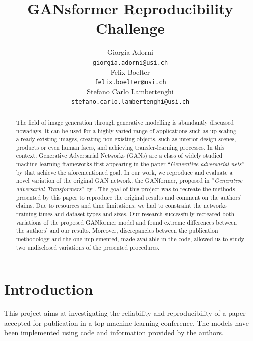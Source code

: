 \documentclass{article}
\title{GANsformer Reproducibility Challenge}
\author{%
	Giorgia Adorni \\
	\texttt{giorgia.adorni@usi.ch} \\
	\And
	Felix Boelter\\
	\texttt{felix.boelter@usi.ch}\\
	\And
	Stefano Carlo Lambertenghi\\
	\texttt{stefano.carlo.lambertenghi@usi.ch}\\
}
\begin{document}
	
	\maketitle
	\begin{abstract}
		The field of image generation through generative modelling is abundantly discussed nowadays. It 
		can be used for a highly varied range of applications such as up-scaling 
		already existing images, creating non-existing objects, such as interior design scenes,
		products or even human faces, and achieving transfer-learning processes. 
		In this context, Generative Adversarial Networks (GANs) are a class of widely studied machine 
		learning frameworks first appearing in the paper ``\emph{Generative adversarial nets}'' by 
		\citet{goodfellow2014generative} that achieve the aforementioned goal. 
		In our work, we reproduce and evaluate a novel variation of the original GAN network, the 
		GANformer, proposed in ``\emph{Generative adversarial Transformers}'' by 
		\citet{hudson2021generative}. 
		The goal of this project was to recreate the methods presented by this paper to reproduce the 
		original results and comment on the authors’ claims. 
		Due to resources and time limitations, we had to constraint the networks training times and 
		dataset types and sizes. 
		Our research successfully recreated both variations of the proposed GANformer model and found 
		extreme differences between the authors’ and our results. 
		Moreover, discrepancies between the publication methodology and the one implemented, 
		made available in the code, allowed us to study two undisclosed variations of the presented 
		procedures.
	\end{abstract}
	
	\section{Introduction}
	This project aims at investigating the reliability and reproducibility of a paper accepted 
	for publication in a top machine learning conference. The models have been implemented 
	using code and information provided by the authors.
	
\end{document}
